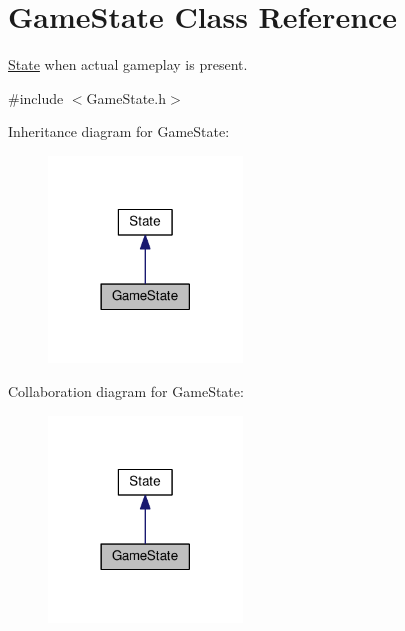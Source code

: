 \hypertarget{classGameState}{\section{Game\-State Class Reference}
\label{classGameState}
}


\hyperlink{classState}{State} when actual gameplay is present.  




{\ttfamily \#include $<$Game\-State.\-h$>$}



Inheritance diagram for Game\-State\-:
\nopagebreak
\begin{figure}[H]
\begin{center}
\leavevmode
\includegraphics[width=146pt]{classGameState__inherit__graph}
\end{center}
\end{figure}


Collaboration diagram for Game\-State\-:
\nopagebreak
\begin{figure}[H]
\begin{center}
\leavevmode
\includegraphics[width=146pt]{classGameState__coll__graph}
\end{center}
\end{figure}
